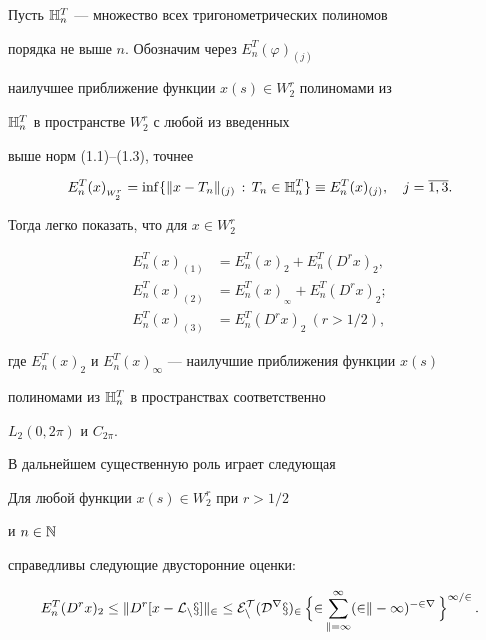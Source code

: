Пусть $\Bbb{H}_n^T$ --- множество всех тригонометрических полиномов


порядка не выше $n$. Обозначим через $E_n^T(\varphi )_{(j)}$


наилучшее приближение функции $x(s)\in W_2^r$ полиномами из


$\Bbb{H}_n^T$ в пространстве $W_2^r$ с любой из введенных


выше норм (1.1)--(1.3), точнее


$$


E_n^T(x)_{{}_{W_2^r}}=\inf\{\|x-T_n\|_{(j)}\, :\,


T_n\in \Bbb{H}_n^T\}\equiv E_n^T(x)_{(j)},\quad j=\overline{1,3}.


$$


Тогда легко показать, что для $x\in W_2^r$


\begin{align*}


E_n^T(x)_{(1)} &= E_n^T(x)_2 +E_n^T(D^rx)_2,\\


E_n^T(x)_{(2)} &= E_n^T(x)_{{}_\infty } + E_n^T(D^rx)_2;\\


E_n^T(x)_{(3)} &= E_n^T(D^rx)_2\ (r>1/2),


\end{align*}


где $E_n^T(x)_2$ и $E_n^T(x)_\infty$ --- наилучшие приближения функции $x(s)$


полиномами из $\Bbb{H}_n^T$ в пространствах соответственно


$L_2(0,2\pi )$ и $C_{2\pi }$.





В дальнейшем существенную роль играет следующая





\begin{lem} Для любой функции $x(s)\in W_2^r$ при $r>1/2$


и $n\in \Bbb{N}$


справедливы следующие двусторонние оценки:


\begin{equation}


E_n^T(D^rx)_2\le \|D^r[x -\cal L_nx]\|_2\le


E_n^T(D^rx)_2\, \Bigl\{ 2\sum_{k=1}^\infty (2k-1)^{-2r}\, \Bigr\}^{1/2}\, .


\end{equation}


\end{lem}





